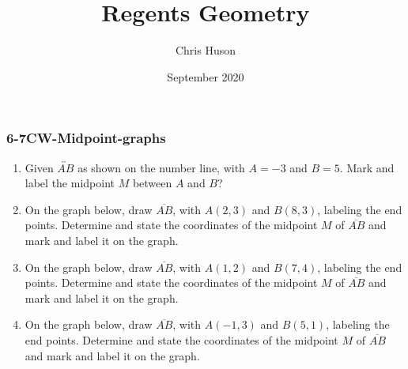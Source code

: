 \documentclass[12pt, twoside]{article}
\title{Regents Geometry}
\author{Chris Huson}
\date{September 2020}
\begin{document}
\subsubsection*{6-7CW-Midpoint-graphs}
\begin{enumerate}
\item Given $\overleftrightarrow{AB}$ as shown on the number line, with $A=-3$ and $B=5$. Mark and label the midpoint $M$ between $A$ and $B$?\\[20pt] %
  
\item On the graph below, draw $\overline{AB}$, with $A(2,3)$ and $B(8,3)$, labeling the end points. Determine and state the coordinates of the midpoint $M$ of $\overline{AB}$ and mark and label it on the graph.
  \begin{flushright}
  \end{flushright}
  
  
\item On the graph below, draw $\overline{AB}$, with $A(1,2)$ and $B(7,4)$, labeling the end points. Determine and state the coordinates of the midpoint $M$ of $\overline{AB}$ and mark and label it on the graph.
  \begin{flushright}
  \end{flushright}
  \vspace{1cm}

\newpage
\item On the graph below, draw $\overline{AB}$, with $A(-1,3)$ and $B(5,1)$, labeling the end points. Determine and state the coordinates of the midpoint $M$ of $\overline{AB}$ and mark and label it on the graph.
  \begin{flushright}
  \end{flushright}


\end{enumerate}
\end{document}
